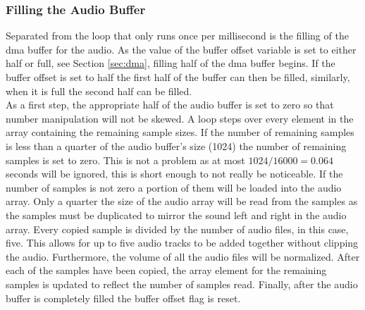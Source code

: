 \documentclass[12pt,a4paper]{report}
\begin{document}
\subsubsection{Filling the Audio Buffer} \label{sec:fillingAud}
Separated from the loop that only runs once per millisecond is the filling of the \ac{dma} buffer for the audio. As the value of the buffer offset variable is set to either half or full, see Section \ref{sec:dma}, filling half of the \ac{dma} buffer begins. If the buffer offset is set to half the first half of the buffer can then be filled, similarly, when it is full the second half can be filled. \\
As a first step, the appropriate half of the audio buffer is set to zero so that number manipulation will not be skewed. A loop steps over every element in the array containing the remaining sample sizes. If the number of remaining samples is less than a quarter of the audio buffer's size (1024) the number of remaining samples is set to zero. This is not a problem as at most $1024 / 16000 = 0.064$ seconds will be ignored, this is short enough to not really be noticeable. If the number of samples is not zero a portion of them will be loaded into the audio array. Only a quarter the size of the audio array will be read from the samples as the samples must be duplicated to mirror the sound left and right in the audio array. Every copied sample is divided by the number of audio files, in this case, five. This allows for up to five audio tracks to be added together without clipping the audio. Furthermore, the volume of all the audio files will be normalized. After each of the samples have been copied, the array element for the remaining samples is updated to reflect the number of samples read. Finally, after the audio buffer is completely filled the buffer offset flag is reset.
\end{document}
